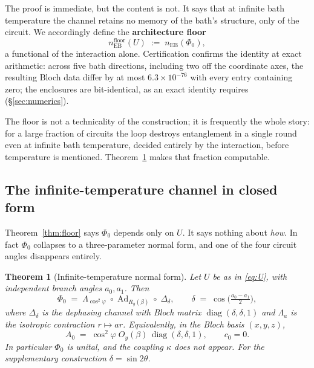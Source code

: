 \documentclass[11pt,a4paper]{article}
\newtheorem{theorem}{Theorem}[section]
\theoremstyle{definition}
\theoremstyle{remark}
\DeclareMathOperator{\diag}{diag}
\newcommand{\nEB}{n_{\mathrm{EB}}}
\newcommand{\floor}{n_{\mathrm{EB}}^{\mathrm{floor}}}
\begin{document}
The proof is immediate, but the content is not. It says that at infinite bath temperature the channel retains no memory of the bath's structure, only of the circuit. We accordingly define the \textbf{architecture floor}
\begin{equation}\label{eq:floordef}
  \floor(U) \;:=\; \nEB(\Phi_0),
\end{equation}
a functional of the interaction alone. Certification confirms the identity at exact arithmetic: across five bath directions, including two off the coordinate axes, the resulting Bloch data differ by at most $6.3\times10^{-76}$ with every entry containing zero; the enclosures are bit-identical, as an exact identity requires (\S\ref{sec:numerics}).

The floor is not a technicality of the construction; it is frequently the whole story: for a large fraction of circuits the loop destroys entanglement in a single round even at infinite bath temperature, decided entirely by the interaction, before temperature is mentioned. Theorem~\ref{thm:normalform} makes that fraction computable.

\subsection{The infinite-temperature channel in closed form}\label{sec:normalform}

Theorem~\ref{thm:floor} says $\Phi_0$ depends only on $U$. It says nothing about \emph{how}. In fact $\Phi_0$ collapses to a three-parameter normal form, and one of the four circuit angles disappears entirely.

\begin{theorem}[Infinite-temperature normal form]\label{thm:normalform}
Let $U$ be as in \eqref{eq:U}, with independent branch angles $a_0,a_1$. Then
\[
  \Phi_0 \;=\; \Lambda_{\cos^2\varphi}\;\circ\;\mathrm{Ad}_{R_y(\beta)}\;\circ\;\Delta_\delta,
  \qquad \delta \;=\; \cos\!\big(\tfrac{a_0-a_1}{2}\big),
\]
where $\Delta_\delta$ is the dephasing channel with Bloch matrix $\diag(\delta,\delta,1)$ and $\Lambda_a$ is the isotropic contraction $r\mapsto ar$. Equivalently, in the Bloch basis $(x,y,z)$,
\[
  A_0 \;=\; \cos^2\!\varphi\;O_y(\beta)\,\diag(\delta,\delta,1), \qquad c_0 = 0 .
\]
In particular $\Phi_0$ is unital, and the coupling $\kappa$ does not appear. For the supplementary construction $\delta = \sin 2\theta$.
\end{theorem}
\end{document}
